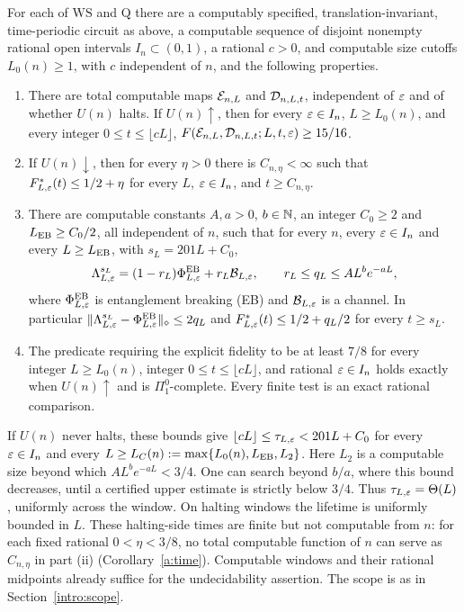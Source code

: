 \begin{theorem}\label{thm:detailed}
For each of \(\mathrm{WS}\) and \(\mathrm Q\) there are a computably specified,
translation-invariant, time-periodic circuit as above, a computable sequence
of disjoint nonempty rational open intervals
\(I_n\subset(0,1)\), a rational \(c>0\), and computable size cutoffs
\(L_0(n)\ge1\), with \(c\) independent of \(n\), and the following properties.
\begin{enumerate}
\item There are total computable maps \(\mathcal E_{n,L}\) and
\(\mathcal D_{n,L,t}\), independent of \(\varepsilon\) and of whether \(U(n)\)
halts. If \(U(n)\uparrow\), then for every \(\varepsilon\in I_n\),
\(L\ge L_0(n)\), and every integer \(0\le t\le\lfloor cL\rfloor\),
\(F(\mathcal E_{n,L},\mathcal D_{n,L,t};L,t,\varepsilon)\ge15/16\).
\item If \(U(n)\downarrow\), then for every \(\eta>0\) there is
\(C_{n,\eta}<\infty\) such that
\(F^*_{L,\varepsilon}(t)\le1/2+\eta\) for every \(L\),
\(\varepsilon\in I_n\), and \(t\ge C_{n,\eta}\).
\item There are computable constants \(A,a>0\), \(b\in\mathbb N\), an integer \(C_0\ge2\)
and \(L_{\rm EB}\ge C_0/2\), all independent of \(n\), such that for every \(n\), every
\(\varepsilon\in I_n\) and every \(L\ge L_{\rm EB}\), with \(s_L=201L+C_0\),
\[
 \Lambda_{L,\varepsilon}^{s_L}=(1-r_L)\Phi^{\rm EB}_{L,\varepsilon}+r_L\mathcal B_{L,\varepsilon},
 \qquad r_L\le q_L\le AL^be^{-aL},
\]
where \(\Phi^{\rm EB}_{L,\varepsilon}\) is entanglement breaking (EB) and
\(\mathcal B_{L,\varepsilon}\) is a channel. In particular
\mbox{\(\|\Lambda_{L,\varepsilon}^{s_L}-\Phi^{\rm EB}_{L,\varepsilon}\|_\diamond\le2q_L\)} and
\(F^*_{L,\varepsilon}(t)\le1/2+q_L/2\) for every \(t\ge s_L\).
\item The predicate requiring the explicit fidelity to be at least
\(7/8\) for every integer \(L\ge L_0(n)\), integer
\(0\le t\le\lfloor cL\rfloor\), and rational \(\varepsilon\in I_n\)
holds exactly when \(U(n)\uparrow\) and is \(\Pi^0_1\)-complete.
Every finite test is an exact rational comparison.
\end{enumerate}
\end{theorem}

If \(U(n)\) never halts, these bounds give
\(\lfloor cL\rfloor\le\tau_{L,\varepsilon}<201L+C_0\) for every \(\varepsilon\in I_n\)
and every \(L\ge L_C(n):=\max\{L_0(n),L_{\rm EB},L_2\}\). Here \(L_2\) is a
computable size beyond which \(AL^be^{-aL}<3/4\). One can search beyond
\(b/a\), where this bound decreases, until a certified upper estimate
is strictly below \(3/4\). Thus
\(\tau_{L,\varepsilon}=\Theta(L)\), uniformly across the window. On halting windows the lifetime is
uniformly bounded in \(L\). These halting-side times are finite but not
computable from \(n\): for each fixed rational \(0<\eta<3/8\), no total
computable function of \(n\) can serve as \(C_{n,\eta}\) in part (ii)
(Corollary~\ref{a:time}). Computable windows and their rational midpoints
already suffice for the undecidability assertion. The scope is as in Section~\ref{intro:scope}.

